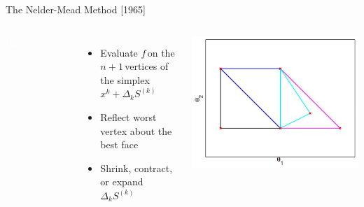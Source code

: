 \documentclass[handout,aspectratio=54]{beamer}
\numberwithin{theorem}{section}
\begin{document}
\begin{frame}{The Nelder-Mead Method [1965]}
\begin{columns}
\colorbox[rgb]{0.5,0.6,0.7}{\textcolor{white}{Basic iteration($k\ge0$):}}
\begin{itemize}\footnotesize
\item Evaluate $f$\,on the $n+1$\,vertices of the simplex\,$x^k+\Delta_kS^{(k)}$
\item Reflect worst vertex about the best face
\item Shrink, contract, or expand\,$\Delta_kS^{(k)}$
\end{itemize}

\includegraphics[width=\textwidth]{fig/18-4.jpg}
\end{columns}

\vspace{2.4cm}
\end{frame}
\end{document}
